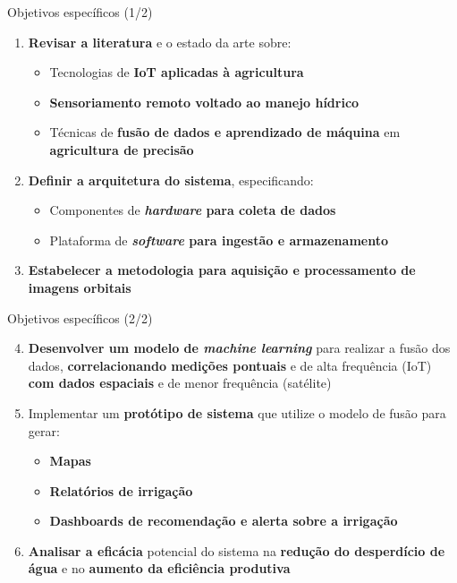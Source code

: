 \documentclass[aspectratio=169]{beamer}
\begin{document}
\begin{frame}{Objetivos específicos (1/2)}
  \begin{enumerate}
    \item \textbf{Revisar a literatura} e o estado da arte sobre:
      \begin{itemize}
        \item Tecnologias de \textbf{IoT aplicadas à agricultura}
        \item \textbf{Sensoriamento remoto voltado ao manejo hídrico}
        \item Técnicas de \textbf{fusão de dados e aprendizado de máquina} em \textbf{agricultura de precisão}
      \end{itemize}
    \item \textbf{Definir a arquitetura do sistema}, especificando:
      \begin{itemize}
        \item Componentes de \textbf{\emph{hardware} para coleta de dados}
        \item Plataforma de \textbf{\emph{software} para ingestão e armazenamento}
      \end{itemize}
    \item \textbf{Estabelecer a metodologia para aquisição e processamento de imagens orbitais}
  \end{enumerate}
\end{frame}

\begin{frame}{Objetivos específicos (2/2)}
  \begin{enumerate}
    \setcounter{enumi}{3}
    \item \textbf{Desenvolver um modelo de \emph{machine learning}} para realizar a fusão dos dados,
          \textbf{correlacionando medições pontuais} e de alta frequência (IoT) \textbf{com dados espaciais} e
          de menor frequência (satélite)
    \item Implementar um \textbf{protótipo de sistema} que utilize o modelo de fusão para gerar:
      \begin{itemize}
        \item \textbf{Mapas}
        \item \textbf{Relatórios de irrigação}
        \item \textbf{Dashboards de recomendação e alerta sobre a irrigação}
      \end{itemize}
    \item \textbf{Analisar a eficácia} potencial do sistema na \textbf{redução do desperdício de água} e no
          \textbf{aumento da eficiência produtiva}
  \end{enumerate}
\end{frame}
\end{document}
